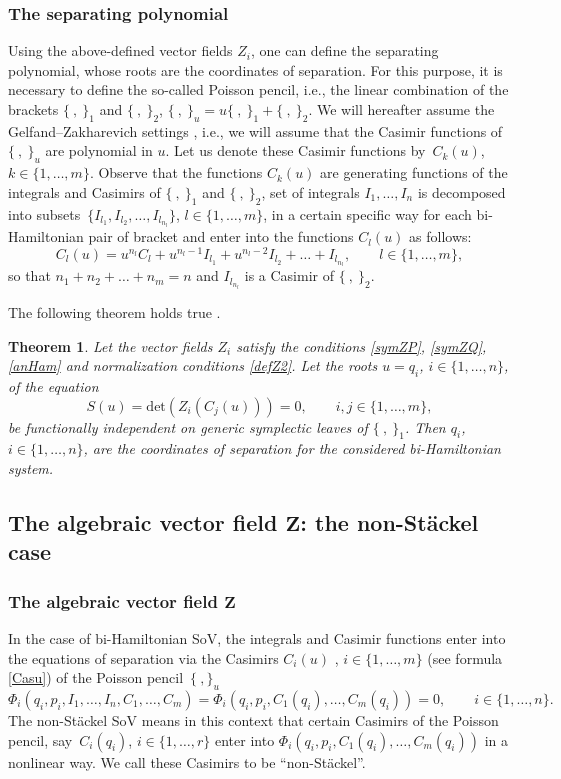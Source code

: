 \documentclass[10pt,a4paper]{amsart}
\numberwithin{equation}{section}
\newtheorem{Theorem}{Theorem}[section]
\begin{document}
\subsubsection{ The separating polynomial}
 Using the above-defined
vector fields $Z_i$, one can define the separating polynomial, whose roots
 are the coordinates of separation. For this purpose, it is
necessary to define the so-called Poisson pencil, i.e., the
linear combination of the brackets $\{\ ,\ \}_1$ and $\{\ ,\
\}_2$,
$
\{\ ,\ \}_u=u \{\ ,\ \}_1+ \{\ ,\ \}_2$.
We will hereafter assume the Gelfand--Zakharevich settings
\cite{GZ}, i.e., we will assume that the Casimir functions of $\{\ ,\ \}_u$ are
polynomial in $u$. Let us denote these Casimir functions by~$C_k(u)$, $k\in \{1, \dots, m\}$. Observe that the functions
$C_k(u)$ are generating functions of the integrals and Casimirs of
$\{\ ,\ \}_1$ and $\{\ ,\ \}_2$, set of integrals
$I_1, \dots , I_n$ is decomposed into subsets~${\{I_{l_1}, I_{l_2},
\dots , I_{l_{n_l}}\}}$, $l\in \{1, \dots, m\}$, in a certain specific way
for each bi-Hamiltonian pair of bracket and enter into the
functions $C_l(u)$ as follows:
\begin{equation}\label{Casu}
C_l(u)=u^{n_l}C_l+ u^{n_l-1} I_{l_1}+ u^{n_l-2} I_{l_2}+ \dots +
I_{l_{n_l}}, \qquad l\in \{1,\dots, m\},
\end{equation}
so that $n_1+n_2+ \dots +n_m=n$ and $I_{l_{n_l}}$ is a Casimir of $\{\
,\ \}_2$.

The following theorem holds true \cite{MFP,FP,FP2}.
\begin{Theorem}\label{MFP}
Let the vector fields $Z_i$ satisfy the conditions \eqref{symZP}, \eqref{symZQ}, \eqref{anHam} and normalization conditions
\eqref{defZ2}.
Let the roots $u=q_i$, $i\in \{1,\dots, n\}$, of the equation
\[%
S(u)=\mathrm{det}(Z_i(C_j(u)))=0, \qquad i,j \in \{1,\dots, m\},
\]
be functionally independent on generic symplectic leaves of $\{\ ,\ \}_1$. Then $q_i$, $i\in \{1, \dots, n\}$, are the coordinates of separation for the considered
bi-Hamiltonian system.
\end{Theorem}

\subsection[The algebraic vector field Z: the non-St\"ackel case]{The algebraic vector field $\boldsymbol{Z}$: the non-St\"ackel case}
\subsubsection[The algebraic vector field Z]{The algebraic vector field $\boldsymbol{Z}$}
In the case of bi-Hamiltonian SoV, the integrals and Casimir functions enter into the equations of separation via the Casimirs $C_i(u)$ , $i\in \{1,\dots, m\}$ (see formula \eqref{Casu}) of the Poisson pencil~$\{\ , \}_u$
\[
\Phi_{i}(q_i,p_i, I_1, \dots ,I_n, C_1, \dots ,C_m)=\Phi_{i}(q_i,p_i, C_1(q_i), \dots ,C_m(q_i))=0, \qquad i\in \{1,\dots, n\}.
\]
The non-St\"ackel SoV means in this context that certain Casimirs of the Poisson pencil, say~$C_i(q_i)$, $i\in \{1,\dots, r\}$ enter into $\Phi_{i}(q_i,p_i, C_1(q_i), \dots ,C_m(q_i))$ in a nonlinear way. We call these Casimirs to be ``non-St\"ackel''.
\end{document}
